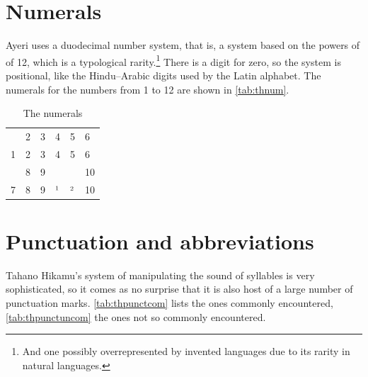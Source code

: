 \section{Numerals}

Ayeri uses a duodecimal number system, that is, a system based on the powers of
of 12, which is a typological rarity.\footnote{And one possibly
overrepresented by invented languages due to its rarity in natural languages.}
There is a digit for zero, so the system is positional, like the Hindu--Arabic
digits used by the Latin alphabet. The numerals for the numbers from 1 to 12
are shown in \autoref{tab:thnum}.

\begin{table}[t]
\caption{The numerals}

\begin{tabu} to \linewidth{X[c] X[c] X[c] X[c] X[c] X[c]}
\toprule
{} & 2 & 3 & 4 & 5 & 6 \\
\rowfont{\Tagati\huge}	1 & 2 & 3 & 4 & 5 & 6 \\

\midrule

 & 8 & 9 & \ten & \elv & 10 \\
\rowfont{\Tagati\huge}	7 & 8 & 9 & ¹ & ² & 10 \\

\bottomrule
\end{tabu}
\label{tab:thnum}
\end{table}



\section{Punctuation and abbreviations}

Tahano Hikamu's system of manipulating the sound of syllables is very 
sophisticated, so it comes as no surprise that it is also host of a large 
number of punctuation marks. \autoref{tab:thpunctcom} lists the ones commonly 
encountered, \autoref{tab:thpunctuncom} the ones not so commonly encountered.

